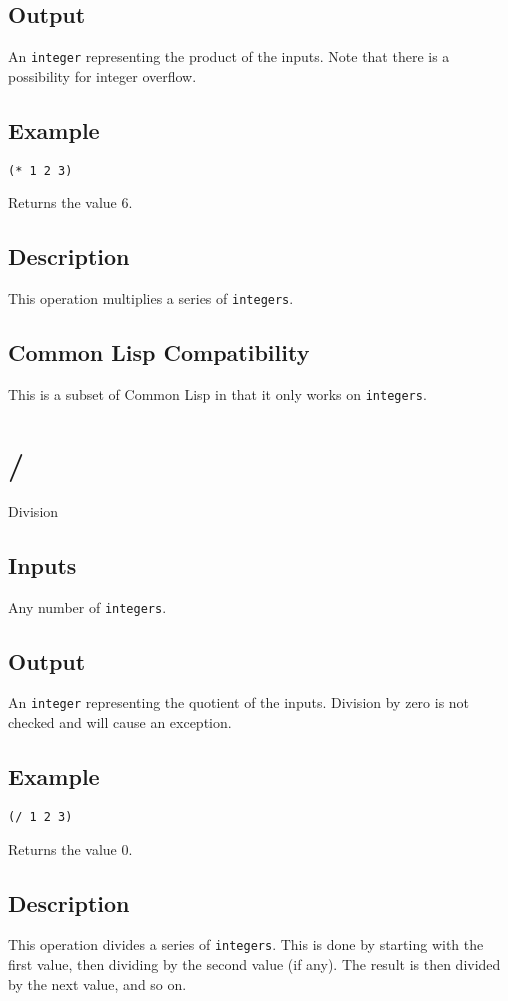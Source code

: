 \documentclass[10pt, openany]{book}
\newcommand{\datatype}[1]{\texttt{#1}}
\newcommand{\cl}{Common Lisp}
\begin{document}
\subsection{Output}
An \datatype{integer} representing the product of the inputs.  Note that there is a possibility for integer overflow.
\subsection{Example}
\begin{lstlisting}
(* 1 2 3)
\end{lstlisting}
Returns the value 6.
\subsection{Description}
This operation multiplies a series of \datatype{integers}.
\subsection{Common Lisp Compatibility}
This is a subset of \cl{} in that it only works on \datatype{integers}.

\section{/}
Division
\subsection{Inputs}
Any number of \datatype{integers}.
\subsection{Output}
An \datatype{integer} representing the quotient of the inputs.  Division by zero is not checked and will cause an exception.
\subsection{Example}
\begin{lstlisting}
(/ 1 2 3)
\end{lstlisting}
Returns the value 0.
\subsection{Description}
This operation divides a series of \datatype{integers}.  This is done by starting with the first value, then dividing by the second value (if any).  The result is then divided by the next value, and so on.
\end{document}
